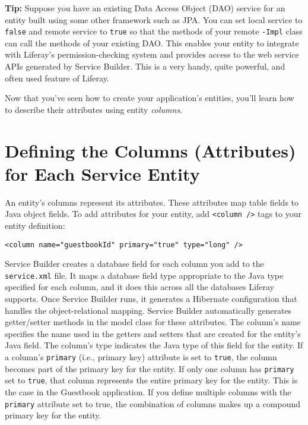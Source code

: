 \textbf{Tip:} Suppose you have an existing Data Access Object (DAO)
service for an entity built using some other framework such as JPA. You
can set local service to \texttt{false} and remote service to
\texttt{true} so that the methods of your remote \texttt{-Impl} class
can call the methods of your existing DAO. This enables your entity to
integrate with Liferay's permission-checking system and provides access
to the web service APIs generated by Service Builder. This is a very
handy, quite powerful, and often used feature of Liferay.

\noindent\hrulefill

Now that you've seen how to create your application's entities, you'll
learn how to describe their attributes using entity \emph{columns}.

\chapter{Defining the Columns (Attributes) for Each Service
Entity}\label{defining-the-columns-attributes-for-each-service-entity}

An entity's columns represent its attributes. These attributes map table
fields to Java object fields. To add attributes for your entity, add
\texttt{\textless{}column\ /\textgreater{}} tags to your entity
definition:

\begin{verbatim}
<column name="guestbookId" primary="true" type="long" />
\end{verbatim}

Service Builder creates a database field for each column you add to the
\texttt{service.xml} file. It maps a database field type appropriate to
the Java type specified for each column, and it does this across all the
databases Liferay supports. Once Service Builder runs, it generates a
Hibernate configuration that handles the object-relational mapping.
Service Builder automatically generates getter/setter methods in the
model class for these attributes. The column's name specifies the name
used in the getters and setters that are created for the entity's Java
field. The column's type indicates the Java type of this field for the
entity. If a column's \texttt{primary} (i.e., primary key) attribute is
set to \texttt{true}, the column becomes part of the primary key for the
entity. If only one column has \texttt{primary} set to \texttt{true},
that column represents the entire primary key for the entity. This is
the case in the Guestbook application. If you define multiple columns
with the \texttt{primary} attribute set to true, the combination of
columns makes up a compound primary key for the entity.

